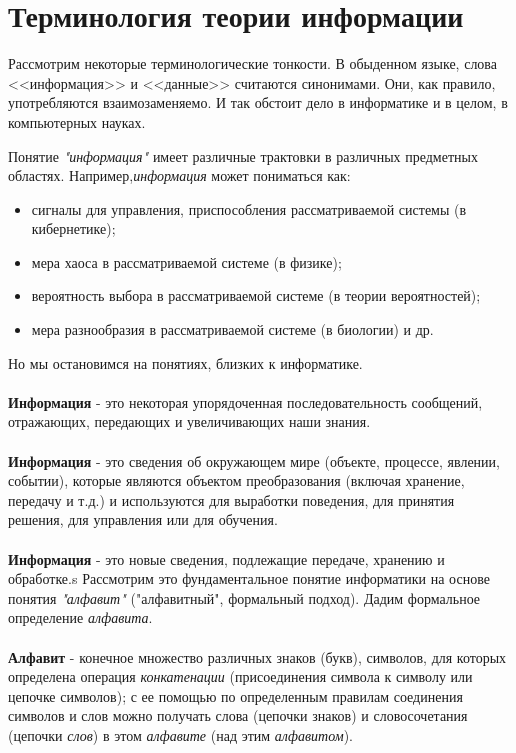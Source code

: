 \section{Терминология теории информации}

Рассмотрим некоторые терминологические тонкости. В обыденном языке, слова <<информация>> и <<данные>> считаются синонимами. Они, как правило, употребляются взаимозаменяемо. И так обстоит дело в информатике и в целом, в компьютерных науках.



Понятие \textit{"информация"} имеет различные трактовки в различных предметных областях. Например,\textit{информация} может пониматься как:
\begin{itemize}
\item сигналы для управления, приспособления рассматриваемой системы (в кибернетике);
\item мера хаоса в рассматриваемой системе (в физике);
\item вероятность выбора в рассматриваемой системе (в теории вероятностей);
\item мера разнообразия в рассматриваемой системе (в биологии) и др.
\end{itemize}
 Но мы остановимся на понятиях, близких к информатике.
\\
\\\textbf{Информация} - это некоторая упорядоченная последовательность сообщений, отражающих, передающих и увеличивающих наши знания.
\\
\\\textbf{Информация} - это сведения об окружающем мире (объекте, процессе, явлении, событии), которые являются объектом преобразования (включая хранение, передачу и т.д.) и используются для выработки поведения, для принятия решения, для управления или для обучения.
\\
\\\textbf{Информация} - это новые сведения, подлежащие передаче, хранению и обработке.s
\newpage 
Рассмотрим это фундаментальное понятие информатики на основе понятия \textit{"алфавит"} ("алфавитный", формальный подход). Дадим формальное определение \textit{алфавита}.
\\
\\\textbf{Алфавит} - конечное множество различных знаков (букв), символов, для которых определена операция \emph{конкатенации} (присоединения символа к символу или цепочке символов); с ее помощью по определенным правилам соединения символов и слов можно получать слова (цепочки знаков) и словосочетания (цепочки \textit{слов}) в этом \textit{алфавите} (над этим \textit{алфавитом}).
